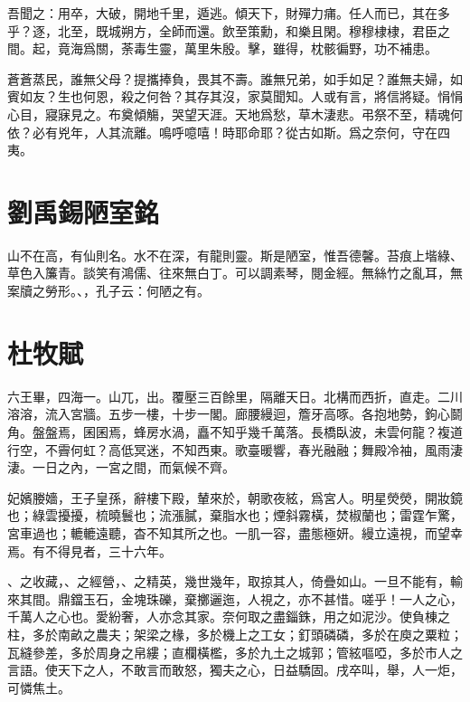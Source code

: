 吾聞之：用卒，大破，開地千里，遁逃。傾天下，財殫力痡。任人而已，其在多乎？逐，北至，既城朔方，全師而還。飲至策勳，和樂且閑。穆穆棣棣，君臣之間。起，竟海爲關，荼毒生靈，萬里朱殷。擊，雖得，枕骸徧野，功不補患。

蒼蒼蒸民，誰無父母？提攜捧負，畏其不壽。誰無兄弟，如手如足？誰無夫婦，如賓如友？生也何恩，殺之何咎？其存其沒，家莫聞知。人或有言，將信將疑。悁悁心目，寢寐見之。布奠傾觴，哭望天涯。天地爲愁，草木淒悲。弔祭不至，精魂何依？必有兇年，人其流離。鳴呼噫嘻！時耶命耶？從古如斯。爲之奈何，守在四夷。

\theendnotes

\section[陋室銘\quad{\small 劉禹錫}]{{\normalsize 劉禹錫}\quad 陋室銘}
山不在高，有仙則名。水不在深，有龍則靈。斯是陋室，惟吾德馨。苔痕上堦綠、草色入簾青。談笑有鴻儒、往來無白丁。可以調素琴，閱金經。無絲竹之亂耳，無案牘之勞形。、，孔子云：何陋之有。

\theendnotes

\section[阿房宮賦\quad{\small 杜牧}]{{\normalsize 杜牧}\quad {}賦}
六王畢，四海一。山兀，出。覆壓三百餘里，隔離天日。北構而西折，直走。二川溶溶，流入宮牆。五步一樓，十步一閣。廊腰縵迴，簷牙高啄。各抱地勢，鉤心鬬角。盤盤焉，囷囷焉，蜂房水渦，矗不知乎幾千萬落。長橋臥波，未雲何龍？複道行空，不霽何虹？高低冥迷，不知西東。歌臺暖響，春光融融；舞殿冷袖，風雨淒淒。一日之內，一宮之間，而氣候不齊。

妃嬪媵嬙，王子皇孫，辭樓下殿，輦來於，朝歌夜絃，爲宮人。明星熒熒，開妝鏡也；綠雲擾擾，梳曉鬟也；流漲膩，棄脂水也；煙斜霧橫，焚椒蘭也；雷霆乍驚，宮車過也；轆轆遠聽，杳不知其所之也。一肌一容，盡態極妍。縵立遠視，而望幸焉。有不得見者，三十六年。

、之收藏，、之經營，、之精英，幾世幾年，取掠其人，倚疊如山。一旦不能有，輸來其間。鼎鐺玉石，金塊珠礫，棄擲邐迤，人視之，亦不甚惜。嗟乎！一人之心，千萬人之心也。愛紛奢，人亦念其家。奈何取之盡錙銖，用之如泥沙。使負棟之柱，多於南畝之農夫；架梁之椽，多於機上之工女；釘頭磷磷，多於在庾之粟粒；瓦縫參差，多於周身之帛縷；直欄橫檻，多於九土之城郭；管絃嘔啞，多於市人之言語。使天下之人，不敢言而敢怒，獨夫之心，日益驕固。戌卒叫，舉，人一炬，可憐焦土。

